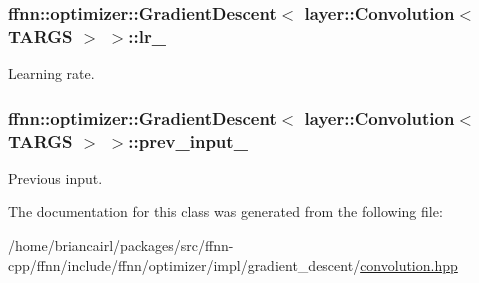 \hypertarget{classffnn_1_1optimizer_1_1_gradient_descent_3_01layer_1_1_convolution_3_01_t_a_r_g_s_01_4_01_4_a756ac46b510f19492b0a7874a8f6831b}{
\subsubsection[{lr\-\_\-}]{ {\bf ffnn\-::optimizer\-::\-Gradient\-Descent}$<$ {\bf layer\-::\-Convolution}$<$ {\bf T\-A\-R\-G\-S} $>$ $>$\-::lr\-\_\-\hspace{0.3cm}{\ttfamily [protected]}}}\label{classffnn_1_1optimizer_1_1_gradient_descent_3_01layer_1_1_convolution_3_01_t_a_r_g_s_01_4_01_4_a756ac46b510f19492b0a7874a8f6831b}


Learning rate. 

\hypertarget{classffnn_1_1optimizer_1_1_gradient_descent_3_01layer_1_1_convolution_3_01_t_a_r_g_s_01_4_01_4_afb2c039078e26446400314336dc24482}{
\subsubsection[{prev\-\_\-input\-\_\-}]{ {\bf ffnn\-::optimizer\-::\-Gradient\-Descent}$<$ {\bf layer\-::\-Convolution}$<$ {\bf T\-A\-R\-G\-S} $>$ $>$\-::prev\-\_\-input\-\_\-\hspace{0.3cm}{\ttfamily [protected]}}}\label{classffnn_1_1optimizer_1_1_gradient_descent_3_01layer_1_1_convolution_3_01_t_a_r_g_s_01_4_01_4_afb2c039078e26446400314336dc24482}


Previous input. 



The documentation for this class was generated from the following file\-:\begin{DoxyCompactItemize}
\item 
/home/briancairl/packages/src/ffnn-\/cpp/ffnn/include/ffnn/optimizer/impl/gradient\-\_\-descent/\hyperlink{optimizer_2impl_2gradient__descent_2convolution_8hpp}{convolution.\-hpp}\end{DoxyCompactItemize}
